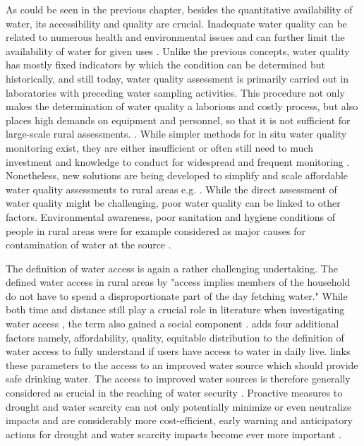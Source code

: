 {As could be seen in the previous chapter, besides the quantitative availability of water, its accessibility and quality are crucial. Inadequate water quality can be related to numerous health and environmental issues and can further limit the availability of water for given uses \autocite{rcrcFORECASTBASEDFINANCINGEARLY2020, faoCopingWaterScarcity2012}. Unlike the previous concepts, water quality has mostly fixed indicators by which the condition can be determined but historically, and still today, water quality assessment is primarily carried out in laboratories with preceding water sampling activities. This procedure not only makes the determination of water quality a laborious and costly process, but also places high demands on equipment and personnel, so that it is not sufficient for large-scale rural assessments. \autocite{tariqOpenSourceWater2021,worldmeteorologicalorganizationPlanningWaterqualityMonitoring2013}. While simpler methods for in situ water quality monitoring exist, they are either insufficient or often still need to much investment and knowledge to conduct for widespread and frequent monitoring \autocite{worldmeteorologicalorganizationPlanningWaterqualityMonitoring2013}. Nonetheless, new solutions are being developed to simplify and scale affordable water quality assessments to rural areas e.g. \autocite{ighaloComprehensiveReviewWater2020,tariqOpenSourceWater2021}. While the direct assessment of water quality might be challenging, poor water quality can be linked to other factors. Environmental awareness, poor sanitation and hygiene conditions of people in rural areas were for example considered as major causes for contamination of water at the source \autocite{zamxakaMicrobiologicalPhysicochemicalAssessment2004}.

The definition of water access is again a rather challenging undertaking. The \autocite[254]{worldbankWorldDevelopmentReport1997} defined water access in rural areas by "access implies members of the household do not have to spend a disproportionate part of the day fetching water." While both time and distance still play a crucial role in literature when investigating water access \autocite{cassiviDrinkingWaterAccessibility2019,cassiviEvaluatingSelfreportedMeasures2021,emenikeAccessingSafeDrinking2017}, the term also gained a social component \autocite{emenikeAccessingSafeDrinking2017,mitlinUnaffordableUndrinkable}. \autocite{obeng-odoomAccessWater2012} adds four additional factors namely, affordability, quality, equitable distribution to the definition of water access to fully understand if users have access to water in daily live. \autocite{unitednations/developmentprogrammeDeepeningDemocracyFragmented2002} links these parameters to the access to an improved water source which should provide safe drinking water.
The access to improved water sources is therefore generally considered as crucial in the reaching of water security \autocite{cdcAssessingAccessWater2022}. Proactive measures to drought and water scarcity can not only potentially minimize or even neutralize impacts and are considerably more cost-efficient, early warning and anticipatory actions for drought and water scarcity impacts become ever more important \autocite{faoandun-waterProgressLevelWater2021,idmpDroughtWaterScarcity2022,worldbankHighDryClimate2016}.

}
